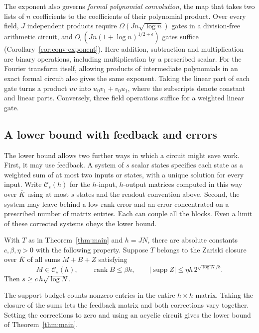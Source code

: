 The exponent also governs \emph{formal polynomial convolution}, the
map that takes two lists of $n$ coefficients to the coefficients of
their polynomial product. Over every field, $J$ independent products
require $\Omega(Jn\sqrt{\log n})$ gates in a division-free arithmetic
circuit, and $O_\epsilon(Jn(1+\log n)^{1/2+\epsilon})$ gates suffice
(Corollary~\ref{cor:conv-exponent}). Here addition, subtraction and
multiplication are binary operations, including multiplication by a
prescribed scalar. For the Fourier transform itself, allowing products
of intermediate polynomials in an exact formal circuit also gives the
same exponent. Taking the linear part of each gate turns a product
$uv$ into $u_0v_1+v_0u_1$, where the subscripts denote constant and
linear parts. Conversely, three field operations suffice for a weighted
linear gate.

\subsection{A lower bound with feedback and errors}

The lower bound allows two further ways in which a circuit might save
work. First, it may use feedback. A system of $s$ scalar states
specifies each state as a weighted sum of at most two inputs or
states, with a unique solution for every input. Write $\mathcal C_s(h)$
for the $h$-input, $h$-output matrices computed in this way over
$\overline K$ using at most $s$ states and the readout convention
above. Second, the system may leave behind a low-rank error and an
error concentrated on a prescribed number of matrix entries. Each
can couple all the blocks. Even a limit of these corrected systems
obeys the lower bound.

\begin{theorem}\label{bch:uniform-robust}
With $T$ as in Theorem~\ref{thm:main} and $h=JN$, there are absolute
constants $c,\beta,\eta>0$ with the following property. Suppose $T$
belongs to the Zariski closure over $\overline K$ of all sums $M+B+Z$
satisfying
\[
 M\in\mathcal C_s(h),\qquad \operatorname{rank}B\le\beta h,\qquad
 |\operatorname{supp} Z|\le\eta h\,2^{\sqrt{\log N}/8}.
\]
Then $s\ge c\,h\sqrt{\log N}$.
\end{theorem}

The support budget counts nonzero entries in the entire $h\times h$
matrix. Taking the closure of the sums lets the feedback matrix and
both corrections vary together. Setting the corrections to zero and
using an acyclic circuit gives the lower bound of Theorem~\ref{thm:main}.

